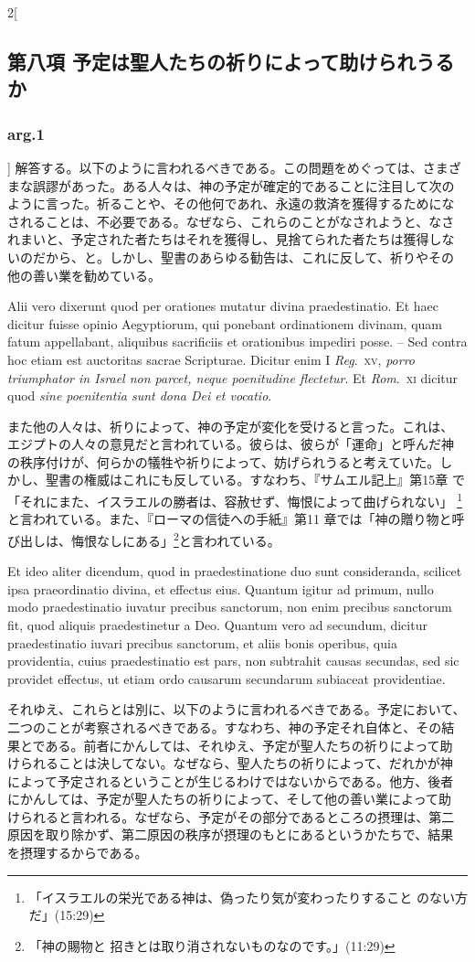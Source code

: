 \documentclass[paper=a4paper,fontsize=10pt,jafontsize=9pt,titlepage]{jlreq}
\begin{document}
\begin{paracol}{2}[\subsection{第八項 予定は聖人たちの祈りによって助けられうるか}\subsubsection{arg.1}]
解答する。以下のように言われるべきである。この問題をめぐっては、さまざ
まな誤謬があった。ある人々は、神の予定が確定的であることに注目して次の
ように言った。祈ることや、その他何であれ、永遠の救済を獲得するためにな
されることは、不必要である。なぜなら、これらのことがなされようと、なさ
れまいと、予定された者たちはそれを獲得し、見捨てられた者たちは獲得しな
いのだから、と。しかし、聖書のあらゆる勧告は、これに反して、祈りやその
他の善い業を勧めている。


\switchcolumn*


Alii vero dixerunt quod per orationes
mutatur divina praedestinatio. Et haec dicitur fuisse opinio
Aegyptiorum, qui ponebant ordinationem divinam, quam fatum appellabant,
aliquibus sacrificiis et orationibus impediri posse. -- Sed contra hoc
etiam est auctoritas sacrae Scripturae. Dicitur enim I {\itshape Reg}.~{\scshape xv}, {\itshape porro
triumphator in Israel non parcet, neque poenitudine flectetur}. Et
{\itshape Rom}.~{\scshape xi} dicitur quod {\itshape sine poenitentia
 sunt dona Dei et vocatio}.


\switchcolumn


また他の人々は、祈りによって、神の予定が変化を受けると言った。これは、
エジプトの人々の意見だと言われている。彼らは、彼らが「運命」と呼んだ神
の秩序付けが、何らかの犠牲や祈りによって、妨げられうると考えていた。し
かし、聖書の権威はこれにも反している。すなわち、『サムエル記上』第15章
で「それにまた、イスラエルの勝者は、容赦せず、悔恨によって曲げられない」
\footnote{「イスラエルの栄光である神は、偽ったり気が変わったりすること
のない方だ」(15:29)}と言われている。また、『ローマの信徒への手紙』第11
章では「神の贈り物と呼び出しは、悔恨なしにある」\footnote{「神の賜物と
招きとは取り消されないものなのです。」(11:29)}と言われている。


\switchcolumn*


Et ideo
aliter dicendum, quod in praedestinatione duo sunt consideranda,
scilicet ipsa praeordinatio divina, et effectus eius. Quantum igitur ad
primum, nullo modo praedestinatio iuvatur precibus sanctorum, non enim
precibus sanctorum fit, quod aliquis praedestinetur a Deo. Quantum vero
ad secundum, dicitur praedestinatio iuvari precibus sanctorum, et aliis
bonis operibus, quia providentia, cuius praedestinatio est pars, non
subtrahit causas secundas, sed sic providet effectus, ut etiam ordo
causarum secundarum subiaceat providentiae.


\switchcolumn


それゆえ、これらとは別に、以下のように言われるべきである。予定において、
二つのことが考察されるべきである。すなわち、神の予定それ自体と、その結
果とである。前者にかんしては、それゆえ、予定が聖人たちの祈りによって助
けられることは決してない。なぜなら、聖人たちの祈りによって、だれかが神
によって予定されるということが生じるわけではないからである。他方、後者
にかんしては、予定が聖人たちの祈りによって、そして他の善い業によって助
けられると言われる。なぜなら、予定がその部分であるところの摂理は、第二
原因を取り除かず、第二原因の秩序が摂理のもとにあるというかたちで、結果
を摂理するからである。



\end{paracol}
\end{document}
